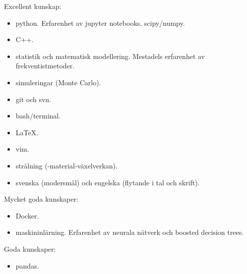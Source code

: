 



\begin{cvskills}



\cvskill
{Excellent kunskap:}
{\begin{itemize} \item python. Erfarenhet av jupyter notebooks, scipy/numpy.
						 \item C++.
						 \item statistik och matematisk modellering. Mestadels erfarenhet av frekventistmetoder.
						 \item simuleringar (Monte Carlo).
						 \item git och svn.
						 \item bash/terminal.
						 \item LaTeX.
						 \item vim.
						 \item strålning (-material-växelverkan).
						 \item svenska (modersmål) och engelska (flytande i tal och skrift).
						  \end{itemize}} %

\cvskill
{Mycket goda kunskaper:}
{\begin{itemize} \item Docker.
						\item maskininlärning. Erfarenhet av neurala nätverk och boosted decision trees.
						\end{itemize}} %

\cvskill
{Goda kunskaper:}
{\begin{itemize} \item pandas.
						\end{itemize}}





\end{cvskills}